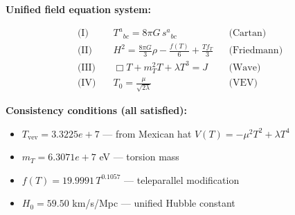 
\textbf{Unified field equation system:}

\begin{align}
  \text{(I)} \quad & T^a{}_{bc} = 8\pi G \, s^a{}_{bc} && \text{(Cartan)} \\
  \text{(II)} \quad & H^2 = \frac{8\pi G}{3}\rho - \frac{f(T)}{6} + \frac{Tf_T}{3} && \text{(Friedmann)} \\
  \text{(III)} \quad & \Box T + m_T^2 T + \lambda T^3 = J && \text{(Wave)} \\
  \text{(IV)} \quad & T_0 = \frac{\mu}{\sqrt{2\lambda}} && \text{(VEV)}
\end{align}

\textbf{Consistency conditions (all satisfied):}
\begin{itemize}
  \item $T_{\text{vev}} = 3.3225e+7$ — from Mexican hat $V(T) = -\mu^2 T^2 + \lambda T^4$
  \item $m_T = 6.3071e+7$ eV — torsion mass
  \item $f(T) = 19.9991 \, T^{0.1057}$ — teleparallel modification
  \item $H_0 = 59.50$ km/s/Mpc — unified Hubble constant
\end{itemize}